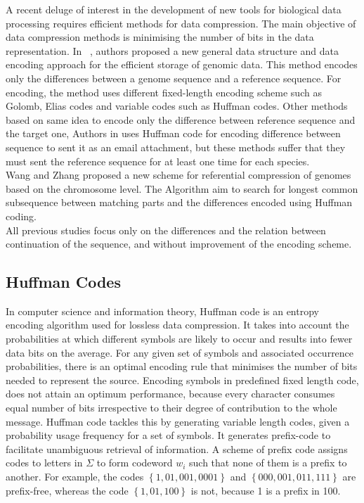 \documentclass[preprint,12pt]{elsarticle}
\begin{document}
A recent deluge of interest in the development of new tools for biological data processing requires efficient methods for data compression. The main objective of data compression methods is minimising the number of bits in the data representation. 
In ~\cite{bra09}, authors proposed a new general data structure and data encoding approach for the efficient storage of genomic data. This method encodes only the differences between a genome sequence and a reference sequence. For encoding, the method uses different fixed-length encoding scheme such as Golomb, Elias codes and variable codes such as Huffman codes. Other methods based on same idea to encode only the difference between reference sequence and the target one, Authors in \cite{chr09} uses Huffman code for encoding difference between sequence to sent it as an email attachment, but these methods suffer that they must sent the reference sequence for at least one time for each species.\\
Wang and Zhang \cite{wan11} proposed a new scheme for referential compression of genomes based on the chromosome level. The Algorithm aim to search for longest common subsequence between matching parts and the differences encoded using Huffman coding.\\
All previous studies focus only on the differences and the relation between continuation of the sequence, and without improvement of the encoding scheme.



\subsection{Huffman Codes}
In computer science and information theory, Huffman code is an entropy encoding algorithm used for lossless data compression. It takes into account the probabilities at which different symbols are likely to occur and results into fewer data bits on the average. 
For any given set of symbols and associated occurrence probabilities, there is an optimal encoding rule that minimises the number of bits needed to represent the source. Encoding symbols in predefined fixed length code, does not attain an optimum performance, because every character consumes equal number of bits irrespective to their degree of contribution to the whole message. Huffman code tackles this by generating variable length codes, given a probability usage frequency for a set of symbols. It generates prefix-code to facilitate unambiguous retrieval of information. A scheme of prefix code assigns codes to letters in $\Sigma$ to form codeword $w_i$ such that none of them is a prefix to another. For example, the codes $\left\{ 1,01,001,0001\right\}$ and $\left\{ 000,001,011,111\right\}$ are prefix-free, whereas the code $\left\{ 1,01,100\right\}$ is not, because 1 is a prefix in 100.
\end{document}
